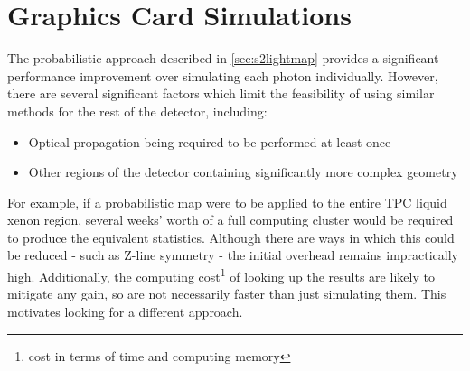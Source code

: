\section{Graphics Card Simulations}

\par
The probabilistic approach described in \autoref{sec:s2lightmap} provides a significant performance improvement over simulating each photon individually. 
However, there are several significant factors which limit the feasibility of using similar methods for the rest of the detector, including:
\begin{itemize}
    \item Optical propagation being required to be performed at least once
    \item Other regions of the detector containing significantly more complex geometry
\end{itemize}
For example, if a probabilistic map were to be applied to the entire TPC liquid xenon region, several weeks' worth of a full computing cluster would be required to produce the equivalent statistics.
Although there are ways in which this could be reduced - such as Z-line symmetry - the initial overhead remains impractically high.
Additionally, the computing cost\footnote{cost in terms of time and computing memory} of looking up the results are likely to mitigate any gain, so are not necessarily faster than just simulating them.
This motivates looking for a different approach.

